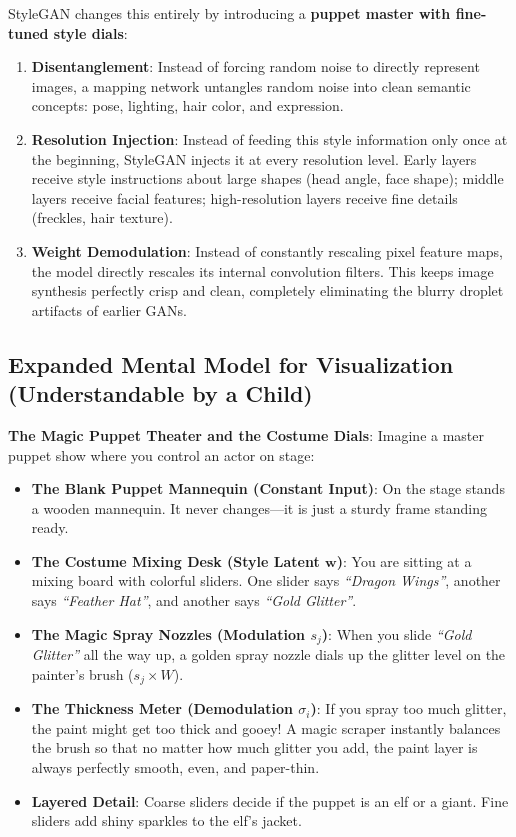 \documentclass[11pt,a4paper]{article}
\theoremstyle{definition}
\begin{document}
StyleGAN changes this entirely by introducing a \textbf{puppet master with fine-tuned style dials}:
\begin{enumerate}
    \item \textbf{Disentanglement}: Instead of forcing random noise to directly represent images, a mapping network untangles random noise into clean semantic concepts: pose, lighting, hair color, and expression.
    \item \textbf{Resolution Injection}: Instead of feeding this style information only once at the beginning, StyleGAN injects it at every resolution level. Early layers receive style instructions about large shapes (head angle, face shape); middle layers receive facial features; high-resolution layers receive fine details (freckles, hair texture).
    \item \textbf{Weight Demodulation}: Instead of constantly rescaling pixel feature maps, the model directly rescales its internal convolution filters. This keeps image synthesis perfectly crisp and clean, completely eliminating the blurry droplet artifacts of earlier GANs.
\end{enumerate}

\subsection{Expanded Mental Model for Visualization (Understandable by a Child)}
\textbf{The Magic Puppet Theater and the Costume Dials}:
Imagine a master puppet show where you control an actor on stage:
\begin{itemize}
    \item \textbf{The Blank Puppet Mannequin (Constant Input)}:
    On the stage stands a wooden mannequin. It never changes—it is just a sturdy frame standing ready.
    
    \item \textbf{The Costume Mixing Desk (Style Latent $\mathbf{w}$)}:
    You are sitting at a mixing board with colorful sliders. One slider says \emph{``Dragon Wings''}, another says \emph{``Feather Hat''}, and another says \emph{``Gold Glitter''}.
    
    \item \textbf{The Magic Spray Nozzles (Modulation $s_j$)}:
    When you slide \emph{``Gold Glitter''} all the way up, a golden spray nozzle dials up the glitter level on the painter's brush ($s_j \times W$).
    
    \item \textbf{The Thickness Meter (Demodulation $\sigma_i$)}:
    If you spray too much glitter, the paint might get too thick and gooey! A magic scraper instantly balances the brush so that no matter how much glitter you add, the paint layer is always perfectly smooth, even, and paper-thin.
    
    \item \textbf{Layered Detail}:
    Coarse sliders decide if the puppet is an elf or a giant. Fine sliders add shiny sparkles to the elf's jacket.
\end{itemize}
\end{document}
